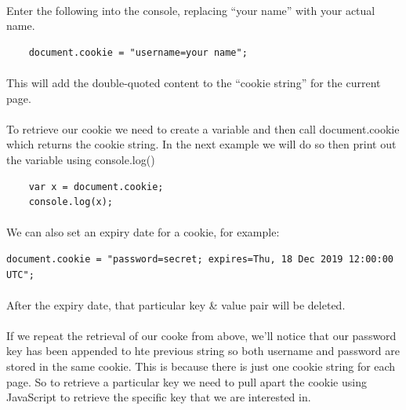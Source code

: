 \documentclass[10pt, a4paper, twosize]{article}
\begin{document}
\paragraph{} Enter the following into the console, replacing ``your name'' with your actual name.
\begin{lstlisting}
    document.cookie = "username=your name";
\end{lstlisting}
\paragraph{} This will add the double-quoted content to the ``cookie string'' for the current page.


\paragraph{} To retrieve our cookie we need to create a variable and then call document.cookie which returns the cookie string. In the next example we will do so then print out the variable using console.log()
\begin{lstlisting}
    var x = document.cookie;
    console.log(x);
\end{lstlisting}
\paragraph{} We can also set an expiry date for a cookie, for example:

\begin{lstlisting}
document.cookie = "password=secret; expires=Thu, 18 Dec 2019 12:00:00 UTC"; 
\end{lstlisting}

\paragraph{} After the expiry date, that particular key \& value pair will be deleted.

\paragraph{} If we repeat the retrieval of our cooke from above, we'll notice that our password key has been appended to hte previous string so both username and password are stored in the same cookie. This is because there is just one cookie string for each page. So to retrieve a particular key we need to pull apart the cookie using JavaScript to retrieve the specific key that we are interested in.
\end{document}
